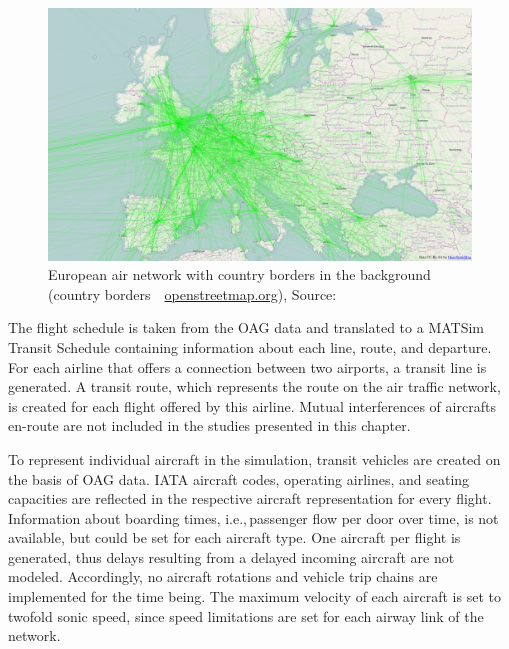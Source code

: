 \begin{figure}[t]
\begin{center}
  \includegraphics[width=\linewidth]{extending/figures/air/air_network_europe_osm.png}
\end{center}
\caption[European air network]{European air network with country borders in the background (country borders~\textcopyright~\url{openstreetmap.org}), Source:~\citet{Grether2014PhD}}
  \label{fig:matsim_air_network_eu}
\end{figure}

The flight schedule is taken from the OAG data and translated to a MATSim Transit Schedule containing information about each line, route, and departure. 
For each airline that offers a connection between two airports, a transit line is generated. 
A transit route, which represents the route on the air traffic network, is created for each flight offered by this airline. 
Mutual interferences of aircrafts en-route are not included in the studies presented in this chapter.


To represent individual aircraft in the simulation, transit vehicles are created on the basis of OAG data. 
IATA aircraft codes, operating airlines, and seating capacities are reflected in the respective aircraft representation for every flight. 
Information about boarding times, i.e.,\,passenger flow per door over time, is not available, but could be set for each aircraft type. 
One aircraft per flight is generated, thus delays resulting from a delayed incoming aircraft are not modeled.
Accordingly, no aircraft rotations and vehicle trip chains are implemented for the time being. 
The maximum velocity of each aircraft is set to twofold sonic speed, since speed limitations are set for each airway link of the network. 


